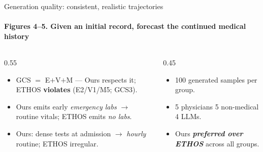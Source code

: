 \documentclass[10pt, aspectratio=169, t]{beamer}   %
\newcommand{\good}[1]{{\color{posblue}\bfseries #1}}  %
\newcommand{\warn}[1]{{\color{negmag}\bfseries #1}}   %
\begin{document}
\begin{frame}{Generation quality: consistent, realistic trajectories}
  \framesubtitle{Figures 4--5. Given an initial record, forecast the continued medical history}
  \vfill
  \begin{columns}[T]
    \begin{column}{0.55\textwidth}
      \begin{tcolorbox}[title={Content \& temporal consistency}]
        \begin{itemize}\setlength{\itemsep}{4pt}
          \item GCS $=$ E$+$V$+$M --- Ours respects it; ETHOS \warn{violates} (E2/V1/M5; GCS3).
          \item Ours emits early \emph{emergency labs} $\to$ routine vitals; ETHOS emits \emph{no labs}.
          \item Ours: dense tests at admission $\to$ \emph{hourly} routine; ETHOS irregular.
        \end{itemize}
      \end{tcolorbox}
    \end{column}
    \begin{column}{0.45\textwidth}
      \begin{tcolorbox}[title={Human \& LLM evaluation (Fig.\ 5)}]
        \begin{itemize}\setlength{\itemsep}{4pt}
          \item 100 generated samples per group.
          \item 5 physicians \textperiodcentered{} 5 non-medical \textperiodcentered{} 4 LLMs.
          \item Ours \good{\emph{preferred over ETHOS}} across all groups.
        \end{itemize}
      \end{tcolorbox}
    \end{column}
  \end{columns}
  \vfill
\end{frame}
\end{document}
